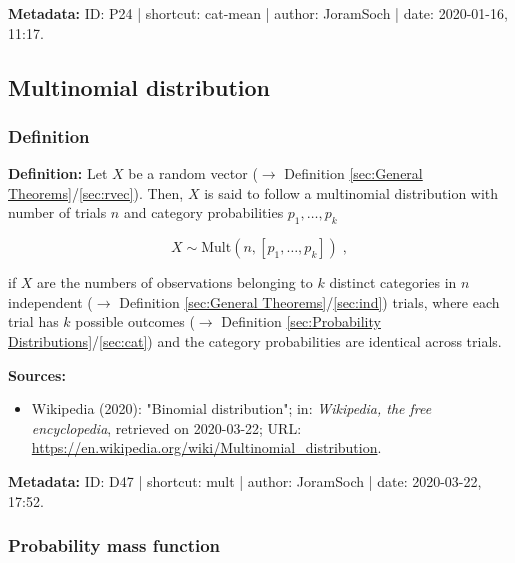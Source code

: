 \documentclass[a4paper,12pt,twoside]{book}
\begin{document}
\vspace{1em}
\textbf{Metadata:} ID: P24 | shortcut: cat-mean | author: JoramSoch | date: 2020-01-16, 11:17.
\vspace{1em}



\subsection{Multinomial distribution}

\subsubsection[\textit{Definition}]{Definition} \label{sec:mult}
\setcounter{equation}{0}

\textbf{Definition:} Let $X$ be a random vector ($\rightarrow$ Definition \ref{sec:General Theorems}/\ref{sec:rvec}). Then, $X$ is said to follow a multinomial distribution with number of trials $n$ and category probabilities $p_1, \ldots, p_k$

\begin{equation} \label{eq:mult-mult}
X \sim \mathrm{Mult}(n, \left[p_1, \ldots, p_k \right]) \; ,
\end{equation}

if $X$ are the numbers of observations belonging to $k$ distinct categories in $n$ independent ($\rightarrow$ Definition \ref{sec:General Theorems}/\ref{sec:ind}) trials, where each trial has $k$ possible outcomes ($\rightarrow$ Definition \ref{sec:Probability Distributions}/\ref{sec:cat}) and the category probabilities are identical across trials.


\vspace{1em}
\textbf{Sources:}
\begin{itemize}
\item Wikipedia (2020): "Binomial distribution"; in: \textit{Wikipedia, the free encyclopedia}, retrieved on 2020-03-22; URL: \url{https://en.wikipedia.org/wiki/Multinomial_distribution}.
\end{itemize}


\vspace{1em}
\textbf{Metadata:} ID: D47 | shortcut: mult | author: JoramSoch | date: 2020-03-22, 17:52.
\vspace{1em}



\subsubsection[\textbf{Probability mass function}]{Probability mass function} \label{sec:mult-pmf}
\setcounter{equation}{0}
\end{document}
